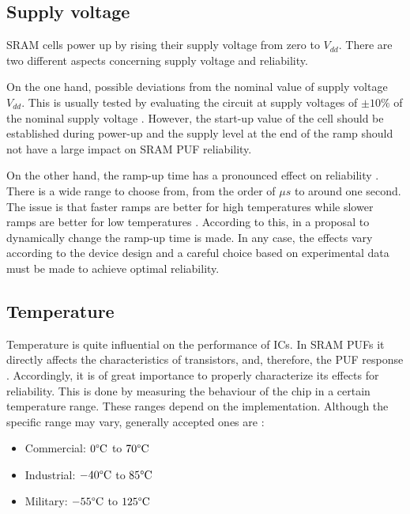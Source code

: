  
\subsection{Supply voltage}


SRAM cells power up by rising their supply voltage from zero to $V_{dd}$. There are two different aspects concerning supply voltage and reliability.

On the one hand, possible deviations from the nominal value of supply voltage $V_{dd}$. This is usually tested by evaluating the circuit at supply voltages of $\pm 10 \%$ of the nominal supply voltage \cite{Schrijen2012}. However, the start-up value of the cell should be established during power-up and the supply level at the end of the ramp should not have a large impact on SRAM PUF reliability.

On the other hand, the ramp-up time has a pronounced effect on reliability \cite{Claes2012,Wang2018}. There is a wide range to choose from, from the order of $\mu s$ to around one second. The issue is that faster ramps are better for high temperatures while slower ramps are better for low temperatures \cite{Cortez2013}. According to this, in \cite{Cortez2013} a proposal to dynamically change the ramp-up time is made. In any case, the effects vary according to the device design and a careful choice based on experimental data must be made to achieve optimal reliability. 


\subsection{Temperature}

Temperature is quite influential on the performance of ICs. In SRAM PUFs it directly affects the characteristics of transistors, and, therefore, the PUF response \cite{Schrijen2012}. Accordingly, it is of great importance to properly characterize its effects for reliability. This is done by measuring the behaviour of the chip in a certain temperature range. These ranges depend on the implementation. Although the specific range may vary, generally accepted ones are \cite{operating_temperature}:

\begin{itemize}
    \item Commercial: $0\degree \mathrm{C}$ to $70\degree \mathrm{C}$
    \item Industrial: $-40\degree \mathrm{C}$ to $85\degree \mathrm{C}$
    \item Military: $-55\degree \mathrm{C}$ to $125\degree \mathrm{C}$
\end{itemize}

